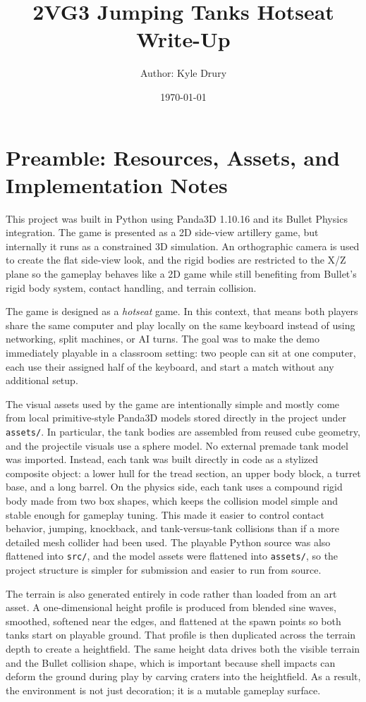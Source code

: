 \documentclass[12pt]{article}
\title{2VG3 Jumping Tanks Hotseat Write-Up}
\author{Author: Kyle Drury}
\date{\today}
\begin{document}
\maketitle

\section*{Preamble: Resources, Assets, and Implementation Notes}
This project was built in Python using Panda3D 1.10.16 and its Bullet Physics integration. The game is presented as a 2D side-view artillery game, but internally it runs as a constrained 3D simulation. An orthographic camera is used to create the flat side-view look, and the rigid bodies are restricted to the X/Z plane so the gameplay behaves like a 2D game while still benefiting from Bullet's rigid body system, contact handling, and terrain collision.

The game is designed as a \emph{hotseat} game. In this context, that means both players share the same computer and play locally on the same keyboard instead of using networking, split machines, or AI turns. The goal was to make the demo immediately playable in a classroom setting: two people can sit at one computer, each use their assigned half of the keyboard, and start a match without any additional setup.

The visual assets used by the game are intentionally simple and mostly come from local primitive-style Panda3D models stored directly in the project under \texttt{assets/}. In particular, the tank bodies are assembled from reused cube geometry, and the projectile visuals use a sphere model. No external premade tank model was imported. Instead, each tank was built directly in code as a stylized composite object: a lower hull for the tread section, an upper body block, a turret base, and a long barrel. On the physics side, each tank uses a compound rigid body made from two box shapes, which keeps the collision model simple and stable enough for gameplay tuning. This made it easier to control contact behavior, jumping, knockback, and tank-versus-tank collisions than if a more detailed mesh collider had been used. The playable Python source was also flattened into \texttt{src/}, and the model assets were flattened into \texttt{assets/}, so the project structure is simpler for submission and easier to run from source.

The terrain is also generated entirely in code rather than loaded from an art asset. A one-dimensional height profile is produced from blended sine waves, smoothed, softened near the edges, and flattened at the spawn points so both tanks start on playable ground. That profile is then duplicated across the terrain depth to create a heightfield. The same height data drives both the visible terrain and the Bullet collision shape, which is important because shell impacts can deform the ground during play by carving craters into the heightfield. As a result, the environment is not just decoration; it is a mutable gameplay surface.
\end{document}
